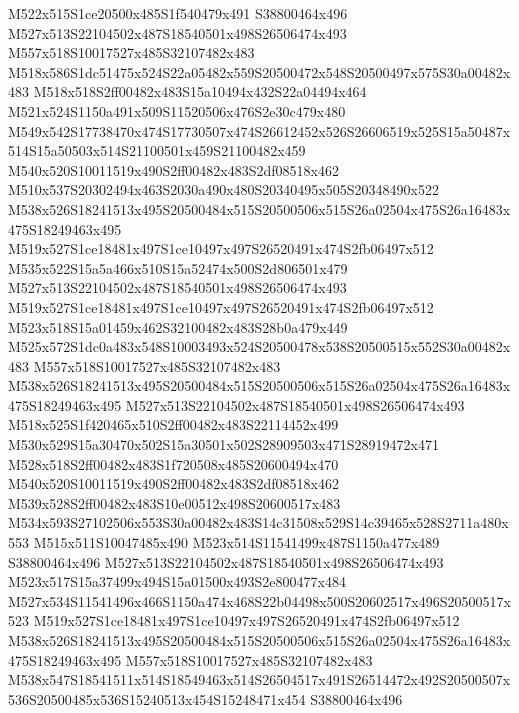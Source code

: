 \documentclass{article}
\begin{document}
\begin{multicols}{2}
M522x515S1ce20500x485S1f540479x491 S38800464x496 M527x513S22104502x487S18540501x498S26506474x493 M557x518S10017527x485S32107482x483 M518x586S1dc51475x524S22a05482x559S20500472x548S20500497x575S30a00482x483 M518x518S2ff00482x483S15a10494x432S22a04494x464 M521x524S1150a491x509S11520506x476S2e30c479x480 M549x542S17738470x474S17730507x474S26612452x526S26606519x525S15a50487x514S15a50503x514S21100501x459S21100482x459 M540x520S10011519x490S2ff00482x483S2df08518x462 M510x537S20302494x463S2030a490x480S20340495x505S20348490x522 M538x526S18241513x495S20500484x515S20500506x515S26a02504x475S26a16483x475S18249463x495 M519x527S1ce18481x497S1ce10497x497S26520491x474S2fb06497x512 M535x522S15a5a466x510S15a52474x500S2d806501x479 M527x513S22104502x487S18540501x498S26506474x493 M519x527S1ce18481x497S1ce10497x497S26520491x474S2fb06497x512 M523x518S15a01459x462S32100482x483S28b0a479x449 M525x572S1dc0a483x548S10003493x524S20500478x538S20500515x552S30a00482x483 M557x518S10017527x485S32107482x483 M538x526S18241513x495S20500484x515S20500506x515S26a02504x475S26a16483x475S18249463x495 M527x513S22104502x487S18540501x498S26506474x493 M518x525S1f420465x510S2ff00482x483S22114452x499 M530x529S15a30470x502S15a30501x502S28909503x471S28919472x471 M528x518S2ff00482x483S1f720508x485S20600494x470 M540x520S10011519x490S2ff00482x483S2df08518x462 M539x528S2ff00482x483S10e00512x498S20600517x483 M534x593S27102506x553S30a00482x483S14c31508x529S14c39465x528S2711a480x553 M515x511S10047485x490 M523x514S11541499x487S1150a477x489 S38800464x496 M527x513S22104502x487S18540501x498S26506474x493 M523x517S15a37499x494S15a01500x493S2e800477x484 M527x534S11541496x466S1150a474x468S22b04498x500S20602517x496S20500517x523 M519x527S1ce18481x497S1ce10497x497S26520491x474S2fb06497x512 M538x526S18241513x495S20500484x515S20500506x515S26a02504x475S26a16483x475S18249463x495 M557x518S10017527x485S32107482x483 M538x547S18541511x514S18549463x514S26504517x491S26514472x492S20500507x536S20500485x536S15240513x454S15248471x454 S38800464x496


\end{multicols}
\end{document}
